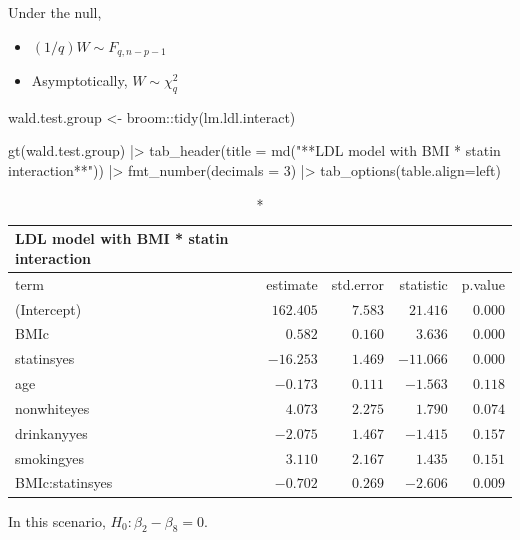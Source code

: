 \documentclass[
  letterpaper,
  DIV=11,
  numbers=noendperiod]{scrreport}
\newenvironment{Shaded}{\begin{snugshade}}{\end{snugshade}}
\newcommand{\AttributeTok}[1]{\textcolor[rgb]{0.40,0.45,0.13}{#1}}
\newcommand{\DecValTok}[1]{\textcolor[rgb]{0.68,0.00,0.00}{#1}}
\newcommand{\FunctionTok}[1]{\textcolor[rgb]{0.28,0.35,0.67}{#1}}
\newcommand{\NormalTok}[1]{\textcolor[rgb]{0.00,0.23,0.31}{#1}}
\newcommand{\OtherTok}[1]{\textcolor[rgb]{0.00,0.23,0.31}{#1}}
\newcommand{\SpecialCharTok}[1]{\textcolor[rgb]{0.37,0.37,0.37}{#1}}
\newcommand{\StringTok}[1]{\textcolor[rgb]{0.13,0.47,0.30}{#1}}
\providecommand{\tightlist}{%
  \setlength{\itemsep}{0pt}\setlength{\parskip}{0pt}}\usepackage{longtable,booktabs,array}
\begin{document}
Under the null,

\begin{itemize}
\tightlist
\item
  \((1/q)W \sim F_{q,n-p-1}\)
\item
  Asymptotically, \(W \sim \chi_q^2\)
\end{itemize}

\begin{Shaded}
\begin{Highlighting}[]
\NormalTok{wald.test.group }\OtherTok{\textless{}{-}}\NormalTok{ broom}\SpecialCharTok{::}\FunctionTok{tidy}\NormalTok{(lm.ldl.interact)}

\FunctionTok{gt}\NormalTok{(wald.test.group) }\SpecialCharTok{|\textgreater{}} 
  \FunctionTok{tab\_header}\NormalTok{(}\AttributeTok{title =} 
               \FunctionTok{md}\NormalTok{(}\StringTok{"**LDL model with BMI * statin interaction**"}\NormalTok{)) }\SpecialCharTok{|\textgreater{}} 
  \FunctionTok{fmt\_number}\NormalTok{(}\AttributeTok{decimals =} \DecValTok{3}\NormalTok{) }\SpecialCharTok{|\textgreater{}} 
  \FunctionTok{tab\_options}\NormalTok{(}\AttributeTok{table.align=}\StringTok{\textquotesingle{}left\textquotesingle{}}\NormalTok{)}
\end{Highlighting}
\end{Shaded}

\begin{longtable}{lrrrr}
\caption*{
{\large \textbf{LDL model with BMI * statin interaction}}
} \\ 
\toprule
term & estimate & std.error & statistic & p.value \\ 
\midrule
(Intercept) & $162.405$ & $7.583$ & $21.416$ & $0.000$ \\ 
BMIc & $0.582$ & $0.160$ & $3.636$ & $0.000$ \\ 
statinsyes & $-16.253$ & $1.469$ & $-11.066$ & $0.000$ \\ 
age & $-0.173$ & $0.111$ & $-1.563$ & $0.118$ \\ 
nonwhiteyes & $4.073$ & $2.275$ & $1.790$ & $0.074$ \\ 
drinkanyyes & $-2.075$ & $1.467$ & $-1.415$ & $0.157$ \\ 
smokingyes & $3.110$ & $2.167$ & $1.435$ & $0.151$ \\ 
BMIc:statinsyes & $-0.702$ & $0.269$ & $-2.606$ & $0.009$ \\ 
\bottomrule
\end{longtable}

In this scenario, \(H_0: \beta_2 - \beta_8 = 0\).
\end{document}
